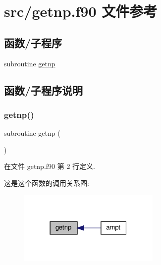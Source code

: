 \hypertarget{getnp_8f90}{}\section{src/getnp.f90 文件参考}
\label{getnp_8f90}
\subsection*{函数/子程序}
\begin{DoxyCompactItemize}
\item 
subroutine \mbox{\hyperlink{getnp_8f90_a7e366bfdab7f7d1a6ba7084f8a6a3a1b}{getnp}}
\end{DoxyCompactItemize}


\subsection{函数/子程序说明}
\mbox{\label{getnp_8f90_a7e366bfdab7f7d1a6ba7084f8a6a3a1b}} 
\subsubsection{\texorpdfstring{getnp()}{getnp()}}
{\footnotesize\ttfamily subroutine getnp (\begin{DoxyParamCaption}{ }\end{DoxyParamCaption})}



在文件 getnp.\+f90 第 2 行定义.

这是这个函数的调用关系图\+:
\nopagebreak
\begin{figure}[H]
\begin{center}
\leavevmode
\includegraphics[width=195pt]{getnp_8f90_a7e366bfdab7f7d1a6ba7084f8a6a3a1b_icgraph}
\end{center}
\end{figure}
